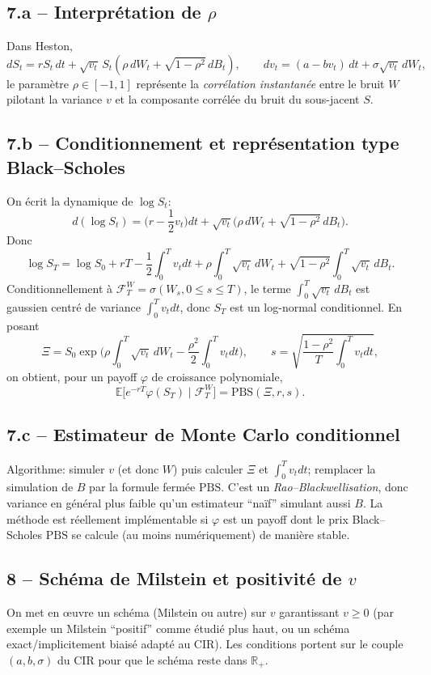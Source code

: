 \documentclass[11pt,a4paper]{article}
\newcommand{\E}{\mathbb{E}}
\newcommand{\R}{\mathbb{R}}
\newcommand{\1}{\mathbbm{1}}
\newcommand{\cF}{\mathcal{F}}
\theoremstyle{plain}
\theoremstyle{definition}
\begin{document}
\subsection{7.a -- Interprétation de $\rho$}
Dans Heston,
\[
dS_t=rS_t\,dt+\sqrt{v_t}\,S_t(\rho\,dW_t+\sqrt{1-\rho^2}\,dB_t),\qquad
dv_t=(a-bv_t)\,dt+\sigma\sqrt{v_t}\,dW_t,
\]
le paramètre $\rho\in[-1,1]$ représente la \emph{corrélation instantanée} entre le bruit $W$ pilotant la variance $v$ et la composante corrélée du bruit du sous-jacent $S$.

\subsection{7.b -- Conditionnement et représentation type Black--Scholes}
On écrit la dynamique de $\log S_t$:
\[
d(\log S_t)=\Big(r-\frac12 v_t\Big)dt+\sqrt{v_t}\big(\rho\,dW_t+\sqrt{1-\rho^2}\,dB_t\big).
\]
Donc
\[
\log S_T=\log S_0+rT-\frac12\int_0^T v_tdt+\rho\int_0^T\sqrt{v_t}\,dW_t
 +\sqrt{1-\rho^2}\int_0^T\sqrt{v_t}\,dB_t.
\]
Conditionnellement à $\cF_T^W=\sigma(W_s,0\le s\le T)$, le terme
$\int_0^T\sqrt{v_t}\,dB_t$ est gaussien centré de variance $\int_0^T v_tdt$, donc $S_T$ est un log-normal conditionnel.
En posant
\[
\Xi=S_0\exp\Big(\rho\int_0^T\sqrt{v_t}\,dW_t-\frac{\rho^2}{2}\int_0^T v_tdt\Big),
\qquad
s=\sqrt{\frac{1-\rho^2}{T}\int_0^T v_tdt},
\]
on obtient, pour un payoff $\varphi$ de croissance polynomiale,
\[
\E\big[e^{-rT}\varphi(S_T)\mid\cF_T^W\big]=\mathrm{PBS}(\Xi,r,s).
\]

\subsection{7.c -- Estimateur de Monte Carlo conditionnel}
Algorithme: simuler $v$ (et donc $W$) puis calculer $\Xi$ et $\int_0^T v_tdt$; remplacer la simulation de $B$ par la formule fermée $\mathrm{PBS}$. C'est un \emph{Rao--Blackwellisation}, donc variance en général plus faible qu'un estimateur ``naïf'' simulant aussi $B$.
La méthode est réellement implémentable si $\varphi$ est un payoff dont le prix Black--Scholes $\mathrm{PBS}$ se calcule (au moins numériquement) de manière stable.

\subsection{8 -- Schéma de Milstein et positivité de $v$}
On met en œuvre un schéma (Milstein ou autre) sur $v$ garantissant $v\ge 0$ (par exemple un Milstein ``positif'' comme étudié plus haut, ou un schéma exact/implicitement biaisé adapté au CIR). Les conditions portent sur le couple $(a,b,\sigma)$ du CIR pour que le schéma reste dans $\R_+$.
\end{document}
